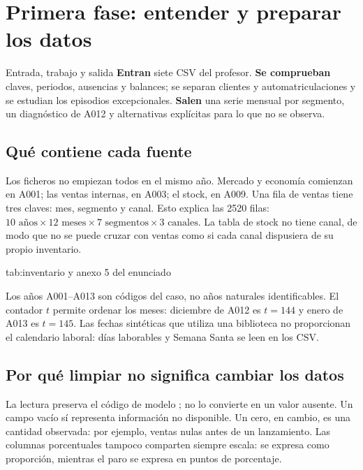 \section{Primera fase: entender y preparar los datos}\label{sec:datos}

\begin{idea}{Entrada, trabajo y salida}
\textbf{Entran} siete CSV del profesor. \textbf{Se comprueban} claves, periodos,
ausencias y balances; se separan clientes y automatriculaciones y se estudian los
episodios excepcionales. \textbf{Salen} una serie mensual por segmento, un
diagnóstico de A012 y alternativas explícitas para lo que no se observa.
\end{idea}

\subsection{Qué contiene cada fuente}
Los ficheros no empiezan todos en el mismo año. Mercado y economía comienzan en
A001; las ventas internas, en A003; el stock, en A009. Una fila de ventas tiene
tres claves: mes, segmento y canal. Esto explica las \num{2520} filas:
$10\text{ años}\times12\text{ meses}\times7\text{ segmentos}\times3\text{ canales}$.
La tabla de stock no tiene canal, de modo que no se puede cruzar con ventas como
si cada canal dispusiera de su propio inventario.

{tab:inventario}{ y anexo 5 del enunciado}

Los años A001--A013 son códigos del caso, no años naturales identificables. El
contador $t$ permite ordenar los meses: diciembre de A012 es $t=144$ y enero de
A013 es $t=145$. Las fechas sintéticas que utiliza una biblioteca no proporcionan
el calendario laboral: días laborables y Semana Santa se leen en los CSV.

\subsection{Por qué limpiar no significa cambiar los datos}
La lectura preserva el código de modelo ; no lo convierte en un
valor ausente. Un campo vacío sí representa información no disponible. Un cero,
en cambio, es una cantidad observada: por ejemplo, ventas nulas antes de un
lanzamiento. Las columnas porcentuales tampoco comparten siempre escala:
 se expresa como proporción, mientras el paro se expresa en
puntos de porcentaje.

